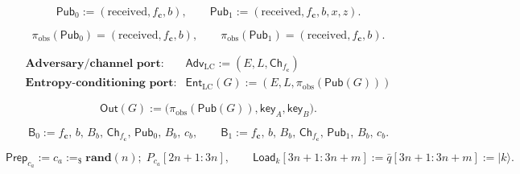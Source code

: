 \documentclass{report}
\theoremstyle{defn_style}
\begin{document}
\[
\mathsf{Pub}_0 := (\mathrm{received},f_{\mathbf c},b),
\qquad
\mathsf{Pub}_1 := (\mathrm{received},f_{\mathbf c},b,x,z).
\]

\[
\pi_{\mathrm{obs}}(\mathsf{Pub}_0)=(\mathrm{received},f_{\mathbf c},b),
\qquad
\pi_{\mathrm{obs}}(\mathsf{Pub}_1)=(\mathrm{received},f_{\mathbf c},b).
\]

\[
\begin{array}{ll}
\textbf{Adversary/channel port:}
& \mathsf{Adv}_{\mathrm{LC}} := (E,L,\mathsf{Ch}_{f_{\mathbf c}}) \\[1mm]
\textbf{Entropy-conditioning port:}
& \mathsf{Ent}_{\mathrm{LC}}(G) := (E,L,\pi_{\mathrm{obs}}(\mathsf{Pub}(G)))
\end{array}
\]

\[
\mathsf{Out}(G)
:=
\bigl(\pi_{\mathrm{obs}}(\mathsf{Pub}(G)),\mathsf{key}_A,\mathsf{key}_B\bigr).
\]

\[
\mathsf{B}_0
:=
f_{\mathbf c},\,b,\,B_b,\,\mathsf{Ch}_{f_{\mathbf c}},\,\mathsf{Pub}_0,\,B_b,\,c_b,
\qquad
\mathsf{B}_1
:=
f_{\mathbf c},\,b,\,B_b,\,\mathsf{Ch}_{f_{\mathbf c}},\,\mathsf{Pub}_1,\,B_b,\,c_b .
\]

\[
\mathsf{Prep}_{c_a}
:=
c_a :=_\$ \textbf{rand}(n);\; P_{c_a}[2n+1{:}3n],
\qquad
\mathsf{Load}_k[3n+1{:}3n+m]
:=
\bar q[3n+1{:}3n+m] := |k\rangle .
\]
\end{document}
